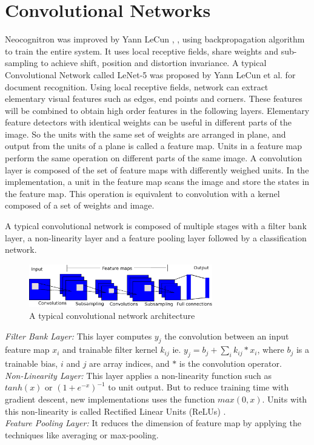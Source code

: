 \documentclass[a4paper]{article}
\begin{document}
\section{Convolutional Networks}
\par Neocognitron was improved by  Yann LeCun \cite{lecun-86}, \cite{lecun-89e}, using backpropagation algorithm  to train the entire system. It uses local receptive fields, share weights and  sub-sampling to achieve  shift, position and distortion invariance. A typical Convolutional Network called  LeNet-5 was proposed by   Yann LeCun et al. \cite{LeCun1998}  for document recognition. Using \allowbreak local receptive fields, network can extract elementary visual features such as edges, end points and corners. These features will be combined to obtain high order features in the following layers. Elementary feature detectors with identical weights can be useful in different parts of the image. So the units with  the same set of weights are arranged in plane, and output from  the units of a plane is called  a feature map. Units in  a feature map perform the same operation on different parts of the same image. A convolution layer is composed of the set of feature maps with differently weighed units. In the implementation, a unit in the feature map scans the image and store the states in the feature map. This operation is equivalent to convolution with a kernel composed of a  set of weights and image. 

\par
A typical convolutional  network is composed of multiple stages with a filter bank layer, a non-linearity layer and a feature pooling layer \cite{lecun2010convolutional} followed by a classification network.\\
\begin{figure}[ht]

 \includegraphics[width=8cm]{Figures/convent.eps}
\caption{A typical convolutional network architecture }
\label{net}
\end{figure}
\emph{Filter Bank Layer:} This layer computes $y_{j}$ the convolution between an input feature map   $x_i$ and trainable filter kernel $k_{ij}$ 
 ie. $y_j=b_j+\sum_i {k_{ij}*x_i}$, where $b_j$ is a trainable bias, $i$ and $j$ are  array indices, and $*$ is the convolution operator.\\
\emph{Non-Linearity Layer:} This layer applies a non-linearity function such as $tanh(x)$ or $(1+e^{-x})^{-1}$ to unit output. But to reduce training time with gradient descent, new implementations uses the function $max(0,x)$. Units with this non-linearity is called Rectified Linear Units (ReLUs) \cite{Nair2010}.\\
\emph{Feature Pooling Layer:} It  reduces the dimension of  feature map by applying the techniques like averaging or max-pooling.
\end{document}
